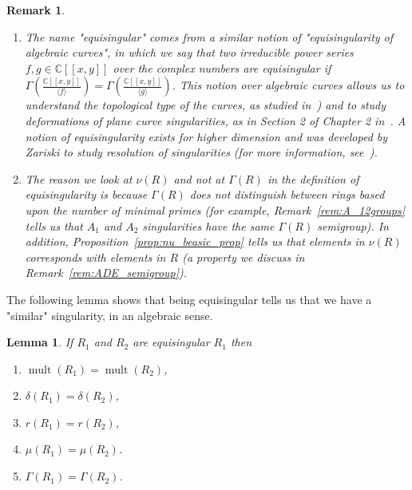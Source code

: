 \documentclass{article}
\newtheorem{lemma}[theorem]{Lemma}
\newtheorem{remark}[theorem]{Remark}
\DeclareMathOperator{\mult}{mult}
\numberwithin{theorem}{section}
\begin{document}
\begin{remark}
\begin{enumerate}
    \item \textup{The name "equisingular" comes from a similar notion of "equisingularity of algebraic curves", in which we say that two irreducible power series $f,g \in \mathbb{C}[[x,y]]$ over the complex numbers are equisingular if $\Gamma\left(\frac{\mathbb{C}[[x,y]]}{\langle f \rangle}\right) = \Gamma\left(\frac{\mathbb{C}[[x,y]]}{\langle g \rangle}\right)$. This notion over algebraic curves allows us to understand the topological type of the curves, as studied in~\cite{zariski2006moduli, zariski1965studies}) and to study deformations of plane curve singularities, as in Section 2 of Chapter 2 in~\cite{greuel2007introduction}. A notion of equisingularity exists for higher dimension and was developed by Zariski to study resolution of singularities (for more information, see~\cite{zariski1971some, parusinski2021algebro, lipman2000equisingularity}).  }
    \item \textup{The reason we look at $\nu(R)$ and not at $\Gamma(R)$ in the definition of equisingularity is because $\Gamma(R)$ does not distinguish between rings based upon the number of minimal primes (for example, Remark~\ref{rem:A_12groups} tells us that $A_1$ and $A_2$ singularities have the same $\Gamma(R)$ semigroup). In addition,  Proposition~\ref{prop:nu_beasic_prop} tells us that elements in $\nu(R)$ corresponds with elements in $R$ (a property we discuss in Remark~\ref{rem:ADE_semigroup}). }
\end{enumerate}
\end{remark}


The following lemma shows that being equisingular tells us that we have a "similar" singularity, in an algebraic sense. 

\begin{lemma}
    If $R_1$ and $R_2$ are equisingular $R_1$ then 
\begin{enumerate}
    \item $\mult(R_1) =  \mult(R_2)$, 
    \item $\delta(R_1) = \delta(R_2)$, 
    \item $r(R_1)=r(R_2)$, 
    \item $\mu(R_1) = \mu(R_2)$. 
    \item $\Gamma(R_1) = \Gamma(R_2)$. 
\end{enumerate}
\end{lemma}
\end{document}
